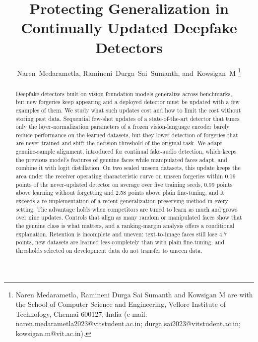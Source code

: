\documentclass[journal]{IEEEtran}
\begin{document}
\title{Protecting Generalization in Continually Updated Deepfake Detectors}

\author{Naren~Medarametla,
Ramineni~Durga~Sai~Sumanth,
and~Kowsigan~M%
\thanks{Naren Medarametla, Ramineni Durga Sai Sumanth and Kowsigan M are with the School of Computer Science and Engineering, Vellore Institute of Technology, Chennai 600127, India (e-mail: naren.medarametla2023@vitstudent.ac.in; durga.sai2023@vitstudent.ac.in; kowsigan.m@vit.ac.in).}}


\maketitle

\begin{abstract}
Deepfake detectors built on vision foundation models generalize across benchmarks, but new forgeries keep appearing and a deployed detector must be updated with a few examples of them. We study what such updates cost and how to limit the cost without storing past data. Sequential few-shot updates of a state-of-the-art detector that tunes only the layer-normalization parameters of a frozen vision-language encoder barely reduce performance on the learned datasets, but they lower detection of forgeries that are never trained and shift the decision threshold of the original task. We adapt genuine-sample alignment, introduced for continual fake-audio detection, which keeps the previous model's features of genuine faces while manipulated faces adapt, and combine it with logit distillation. On two sealed unseen datasets, this update keeps the area under the receiver operating characteristic curve on unseen forgeries within 0.19 points of the never-updated detector on average over five training seeds, 0.99 points above learning without forgetting and 2.58 points above plain fine-tuning, and it exceeds a re-implementation of a recent generalization-preserving method in every setting. The advantage holds when competitors are tuned to learn as much and grows over nine updates. Controls that align as many random or manipulated faces show that the genuine class is what matters, and a ranking-margin analysis offers a conditional explanation. Retention is incomplete and uneven: text-to-image faces still lose 4.7 points, new datasets are learned less completely than with plain fine-tuning, and thresholds selected on development data do not transfer to unseen data.
\end{abstract}
\end{document}
